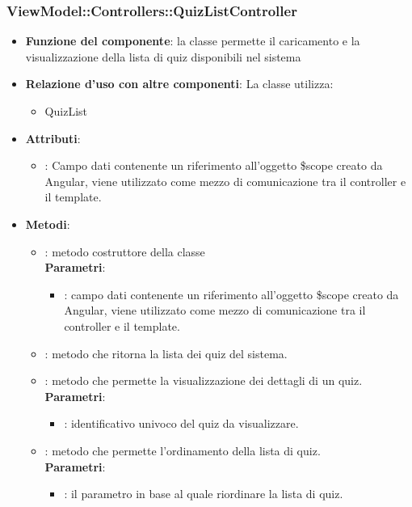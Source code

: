 \subsubsection{ViewModel::Controllers::QuizListController}
\begin{itemize}
\item\textbf{Funzione del componente}:  la classe permette il caricamento e la visualizzazione della lista di quiz disponibili nel sistema
	\item\textbf{Relazione d'uso con altre componenti}:
La classe utilizza:
	\begin{itemize}
		\item QuizList
	\end{itemize}
\item\textbf{Attributi}:
	\begin{itemize}
		\item{}: Campo dati contenente un riferimento all’oggetto \$scope creato da Angular, viene utilizzato come mezzo di comunicazione tra il controller e il template.\\
	\end{itemize}
\item\textbf{Metodi}:
	\begin{itemize}
		\item{}: metodo costruttore della classe\\
		\textbf{Parametri}:
			\begin{itemize}
				\item{}: campo dati contenente un riferimento all’oggetto \$scope creato da Angular, viene utilizzato come mezzo di comunicazione tra il controller e il template.\\
			\end{itemize}
		\item{}: metodo che ritorna la lista dei quiz del sistema.\\
		\item{}: metodo che permette la visualizzazione dei dettagli di un quiz.\\
		\textbf{Parametri}:
			\begin{itemize}
				\item{}: identificativo univoco del quiz da visualizzare.\\
			\end{itemize}
		\item{}: metodo che permette l'ordinamento della lista di quiz.\\
		\textbf{Parametri}:
			\begin{itemize}
				\item{}: il parametro in base al quale riordinare la lista di quiz.\\
			\end{itemize}
	\end{itemize}
\end{itemize}

